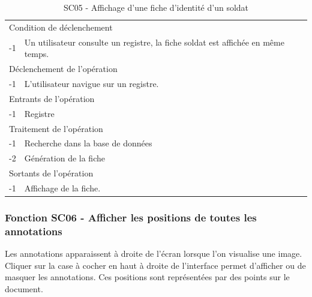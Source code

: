 \documentclass[a4paper]{article}
\begin{document}
\begin{table}[H]
  \centering
   \small
	\begin{tabular}{|c|p{12cm}|}
   		\hline
   			\rowcolor{lightgray}\multicolumn{2}{|c|}{\textbf{SC05 - Affichage d'une fiche d'identité d'un soldat}} \\
   		\hline
   			\multicolumn{2}{|l|}{Condition de d\'eclenchement} \\
   		\hline
   		-1 & Un utilisateur consulte un registre, la fiche soldat est affich\'ee en m\^eme temps. \\
   		\hline
   			\multicolumn{2}{|l|}{D\'eclenchement de l'op\'eration} \\
   		\hline
   			-1 & L'utilisateur navigue sur un registre. \\
   		\hline
   			\multicolumn{2}{|l|}{Entrants de l'op\'eration} \\
   		\hline
   			-1 & Registre \\
   		\hline
   			\multicolumn{2}{|l|}{Traitement de l'op\'eration} \\
  		\hline
   			-1 & Recherche dans la base de donn\'ees \\
            -2 & G\'en\'eration de la fiche \\
   		\hline
   			\multicolumn{2}{|l|}{Sortants de l'op\'eration} \\
   		\hline
   			-1 & Affichage de la fiche. \\
   		\hline
	\end{tabular}
  \caption{SC05 - Affichage d'une fiche d'identité d'un soldat}
  \normalsize
  \label{tab:affichage_fiche}
\end{table}


\subsubsection{Fonction SC06 - Afficher les positions de toutes les annotations}
Les annotations apparaissent à droite de l’écran lorsque l’on visualise une image. Cliquer sur la case à cocher en haut à droite de l’interface permet d’afficher ou de masquer les annotations. Ces positions sont représentées par des points sur le document.\\
\end{document}
